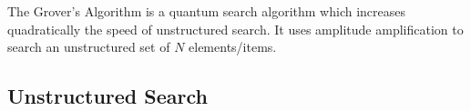 \documentclass{article}
\begin{document}
The Grover's Algorithm is a quantum search algorithm which increases quadratically the speed of unstructured search\cite{noauthor_grovers_nodate}. It uses  amplitude amplification to search an unstructured set of $N$ elements/items. 

\subsection{Unstructured Search}
\vspace{10mm}

\begin{figure}[h]
  \begin{center}


    \begin{tikzpicture}[x=0.75pt,y=0.75pt,yscale=-1,xscale=1]


\end{tikzpicture}
\end{center}
\end{figure}
\end{document}
